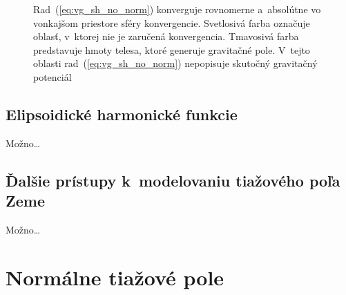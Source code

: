 \documentclass[a4paper, 12pt]{book}
\begin{document}
\begin{figure}
\centering

\caption{Rad~(\ref{eq:vg_sh_no_norm}) konverguje rovnomerne a~absolútne vo 
vonkajšom priestore sféry konvergencie.  Svetlosivá farba označuje oblasť, 
v~ktorej nie je zaručená konvergencia.  Tmavosivá farba predstavuje hmoty 
telesa, ktoré generuje gravitačné pole.  V~tejto oblasti 
rad~(\ref{eq:vg_sh_no_norm}) nepopisuje skutočný gravitačný potenciál}
\label{fig:spherical_harmonics_convergence}
\end{figure}







\section{Elipsoidické harmonické funkcie}

Možno\dots







\section{Ďalšie prístupy k~modelovaniu tiažového poľa Zeme}

Možno\dots










\chapter{Normálne tiažové pole}
\label{sec:normal_gravity_field}







\end{document}
